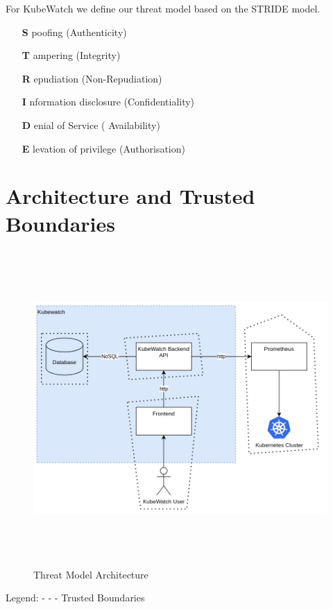For KubeWatch we define our threat model based on the STRIDE model.
\begin{itemize}
    \item [{\bfseries S}]poofing (Authenticity)
    \item [{\bfseries T}]ampering (Integrity)
    \item [{\bfseries R}]epudiation (Non-Repudiation)
    \item [{\bfseries I}]nformation disclosure (Confidentiality)
    \item [{\bfseries D}]enial of Service ( Availability)
    \item [{\bfseries E}]levation of privilege (Authorisation)
\end{itemize}


\section{Architecture and Trusted Boundaries}

\begin{figure}[h]
    \centering
    \caption{\label{fig:threat-model-architecture}Threat Model Architecture}
    \includegraphics[height=12cm]{resources/architecture_threat_model.png}
\end{figure}
Legend: \newline
- - - Trusted Boundaries


\newpage
